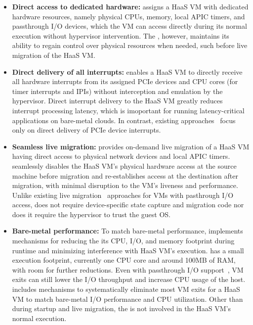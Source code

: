 \begin{itemize} 
\parskip 0mm
\itemsep 0mm

\item {\bf Direct access to dedicated hardware:} 
\na assigns a HaaS VM with 
dedicated hardware resources, namely 
physical CPUs, memory, local APIC timers, and passthrough I/O devices,
which the VM can access directly 
during its normal execution without hypervisor intervention. 
The \sna, however, maintains its ability to
regain control over physical resources when needed, such 
before live migration of the HaaS VM.


\item {\bf Direct delivery of all interrupts:}
\na enables a HaaS VM to directly receive all hardware interrupts from 
its assigned PCIe devices and CPU cores (for timer interrupts and IPIs) 
without interception and emulation by the hypervisor.
Direct interrupt delivery to the HaaS VM greatly
reduces interrupt processing latency, which is imoportant for running 
latency-critical applications on bare-metal clouds.
In contrast, existing approaches~\cite{vfio,postedinterrupt,amit:2015,tu:2015}
focus only on direct delivery of PCIe device interrupts.


\item {\bf Seamless live migration:}
\na provides on-demand live migration of a HaaS VM having direct access to 
physical network devices and local APIC timers. 
\na seamlessly disables the HaaS VM's physical hardware access at the 
source machine before migration and 
re-establishes access at the destination after migration,
with minimal disruption to the VM's liveness and performance.
Unlike existing live migration~\cite{vfio-live-migration,blmvisor-journal,ondemand} 
approaches for VMs with pasthrough 
I/O access, \na does not require device-specific state capture and migration code 
nor does it require the hypervisor to trust the guest OS. 

\item {\bf Bare-metal performance:}  
To match bare-metal performance, \na implements mechanisms
for reducing the its CPU, I/O, and memory footprint
during runtime and minimizing interference with HaaS VM's execution.
\na has a small execution footprint, currently one 
CPU core and around 100MB of RAM, with room for further reductions.
Even with passthrough I/O support~\cite{intelvtd-paper,intelvtd-manual}, 
VM exits can still lower the I/O throughput and increase CPU usage of the host.
\na includes mechanisms to systematically eliminate
most VM exits for a HaaS VM to match bare-metal I/O performance and CPU utilization.
Other than during startup and live migration, the \na is not involved in the
HaaS VM's normal execution.

\end{itemize}

